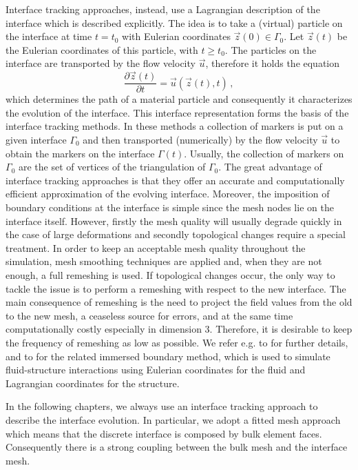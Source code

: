 Interface tracking approaches, instead, use a Lagrangian description of the
interface which is described explicitly. The idea is to take a (virtual)
particle on the interface at time $t=t_0$ with Eulerian coordinates $\vec z(0)
\in \Gamma_0$. Let $\vec z(t)$ be the Eulerian coordinates of this particle,
with $t\geq t_0$. The particles on the interface are transported by the flow
velocity $\vec u$, therefore it holds the equation
\begin{equation}
\frac{\partial \vec z(t)}{\partial t}=\vec u(\vec z(t),t)\,,
\end{equation}
which determines the path of a material particle and consequently it
characterizes the evolution of the interface. This interface representation
forms the basis of the interface tracking methods. In these methods a
collection of markers is put on a given interface $\Gamma_0$ and then
transported (numerically) by the flow velocity $\vec u$ to obtain the markers
on the interface $\Gamma(t)$. Usually, the collection of markers on $\Gamma_0$
are the set of vertices of the triangulation of $\Gamma_0$. The great
advantage of interface tracking approaches is that they offer an accurate and
computationally efficient approximation of the evolving interface. Moreover,
the imposition of boundary conditions at the interface is simple since the mesh
nodes lie on the interface itself. However, firstly the mesh quality will
usually degrade quickly in the case of large deformations and secondly
topological changes require a special treatment. In order to keep an
acceptable mesh quality throughout the simulation, mesh smoothing techniques
are applied and, when they are not enough, a full remeshing is used. If
topological changes occur, the only way to tackle the issue is to
perform a remeshing with respect to the new interface. The main consequence of
remeshing is the need to project the field values from the old to the new
mesh, a ceaseless source for errors, and at the same time computationally
costly especially in dimension 3. Therefore, it is desirable to keep the
frequency of remeshing as low as possible. We refer e.g. to
\cite{UnverdiT92,Bansch01,Tryggvason_etal01,GanesanMT07,GanesanT08,spurious}
for further details, and to \cite{LevequeL97,Peskin02} for the related immersed
boundary method, which is used to simulate fluid-structure interactions using
Eulerian coordinates for the fluid and Lagrangian coordinates for the structure.

In the following chapters, we always use an interface tracking approach to
describe the interface evolution. In particular, we adopt a fitted mesh approach
which means that the discrete interface is composed by bulk element faces.
Consequently there is a strong coupling between the bulk mesh and the interface
mesh.

